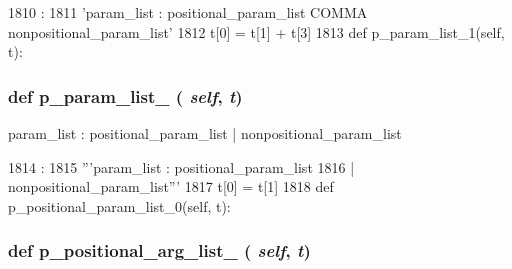 \begin{DoxyCode}
1810                                :
1811         'param_list : positional_param_list COMMA nonpositional_param_list'
1812         t[0] = t[1] + t[3]
1813 
    def p_param_list_1(self, t):
\end{DoxyCode}
\hypertarget{classisa__parser_1_1ISAParser_a149ac42b4c3256238fa136cbd735db9e}{
\subsubsection[{p\_\-param\_\-list\_\-1}]{\setlength{\rightskip}{0pt plus 5cm}def p\_\-param\_\-list\_ ( {\em self}, \/   {\em t})}}
\label{classisa__parser_1_1ISAParser_a149ac42b4c3256238fa136cbd735db9e}
\begin{DoxyVerb}param_list : positional_param_list
      | nonpositional_param_list\end{DoxyVerb}
 


\begin{DoxyCode}
1814                                :
1815         '''param_list : positional_param_list
1816                       | nonpositional_param_list'''
1817         t[0] = t[1]
1818 
    def p_positional_param_list_0(self, t):
\end{DoxyCode}
\hypertarget{classisa__parser_1_1ISAParser_a9e7e39d25a6a5ddee97421ecbe9a1334}{
\subsubsection[{p\_\-positional\_\-arg\_\-list\_\-0}]{\setlength{\rightskip}{0pt plus 5cm}def p\_\-positional\_\-arg\_\-list\_ ( {\em self}, \/   {\em t})}}
\label{classisa__parser_1_1ISAParser_a9e7e39d25a6a5ddee97421ecbe9a1334}




